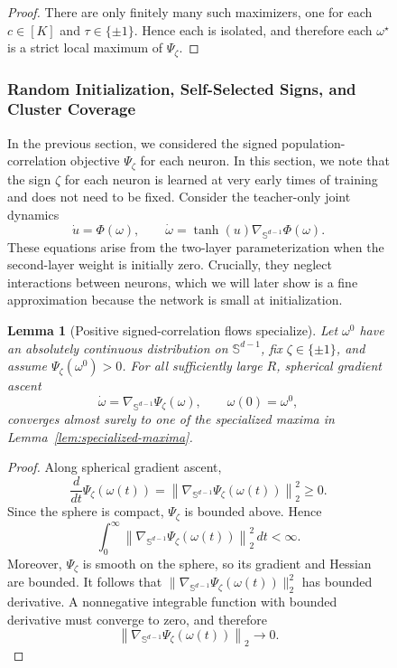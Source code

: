 \documentclass{article}
\newcounter{initialization}[section]
\newtheorem{lemma}[lemma]{Lemma}
\begin{document}
\begin{figure}
\begin{proof}
There are only finitely many such maximizers, one for each
$c\in[K]$ and $\tau\in\{\pm1\}$. Hence each is isolated, and therefore each
$\omega^\star$ is a strict local maximum of $\Psi_\zeta$.

\end{proof}


\subsubsection{Random Initialization, Self-Selected Signs, and Cluster Coverage}

In the previous section, we considered the signed population-correlation objective $\Psi_{\zeta}$ for each neuron. In this section, we note that the sign $\zeta$ for each neuron is learned at very early times of training and does not need to be fixed. Consider
the teacher-only joint dynamics
\begin{equation}
    \dot u=\Phi({\omega}),
    \qquad
    {\dot\omega}
    =\tanh(u)\nabla_{\mathbb S^{d-1}}\Phi({\omega}).
\end{equation}
These equations arise from the two-layer parameterization when the
second-layer weight is initially zero. Crucially, they neglect interactions between neurons, which we will later show is a fine approximation because the network is small at initialization.

\begin{lemma}[Positive signed-correlation flows specialize]
\label{lem:positive-signed-flow}
Let ${\omega^0}$ have an absolutely continuous distribution on
$\mathbb S^{d-1}$, fix $\zeta\in\{\pm1\}$, and assume
$\Psi_\zeta({\omega^0})>0$. For all sufficiently large $R$, spherical gradient
ascent
\[
    {\dot\omega}
    =\nabla_{\mathbb S^{d-1}}\Psi_\zeta({\omega}),
    \qquad
    {\omega(0)}={\omega^0},
\]
converges almost surely to one of the specialized maxima in
Lemma~\ref{lem:specialized-maxima}.
\end{lemma}



\begin{proof}
Along spherical gradient ascent,
\[
    \frac{d}{dt}\Psi_\zeta({\omega(t)})
    =
    \left\|
        \nabla_{\mathbb S^{d-1}}\Psi_\zeta({\omega(t)})
    \right\|_2^2
    \geq 0.
\]
Since the sphere is compact, $\Psi_\zeta$ is bounded above. Hence
\[
    \int_0^\infty
    \left\|
        \nabla_{\mathbb S^{d-1}}\Psi_\zeta({\omega(t)})
    \right\|_2^2\,dt
    <\infty.
\]
Moreover, $\Psi_\zeta$ is smooth on the sphere, so its gradient and Hessian
are bounded. It follows that
$\|\nabla_{\mathbb S^{d-1}}\Psi_\zeta({\omega(t)})\|_2^2$ has bounded derivative.
A nonnegative integrable function with bounded derivative must converge to
zero, and therefore
\[
    \left\|
        \nabla_{\mathbb S^{d-1}}\Psi_\zeta({\omega(t)})
    \right\|_2
    \longrightarrow 0.
\]


\end{proof}
\end{figure}
\end{document}
